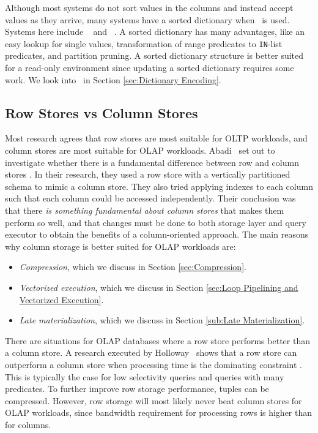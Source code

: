 Although most systems do not sort values in the columns and instead accept values as they arrive, many systems have a sorted dictionary when \de~is used. Systems here include \blink~\cite{Johnson2008-cp} and \saph~\cite{Farber2012-vh}. A sorted dictionary has many advantages, like an easy lookup for single values, transformation of range predicates to \texttt{IN}-list predicates, and partition pruning. A sorted dictionary structure is better suited for a read-only environment since updating a sorted dictionary requires some work. We look into \de~in Section \ref{sec:Dictionary Encoding}. 

\subsection{Row Stores vs Column Stores}
\label{sub:Row Stores vs Column Stores}
Most research agrees that row stores are most suitable for OLTP workloads, and column stores are most suitable for OLAP workloads. Abadi \ea~set out to investigate whether there is a fundamental difference between row and column stores \cite{Abadi2008-dd}. In their research, they used a row store with a vertically partitioned schema to mimic a column store. They also tried applying indexes to each column such that each column could be accessed independently. Their conclusion was that there \textit{is something fundamental about column stores} that makes them perform so well, and that changes must be done to both storage layer and query executor to obtain the benefits of a column-oriented approach. The main reasons why column storage is better suited for OLAP workloads are:
\begin{itemize}
  \item \textit{Compression}, which we discuss in Section \ref{sec:Compression}.
  \item \textit{Vectorized execution}, which we discuss in Section \ref{sec:Loop Pipelining and Vectorized Execution}. 
  \item \textit{Late materialization}, which we discuss in Section \ref{sub:Late Materialization}. 
\end{itemize}

There are situations for OLAP databases where a row store performs better than a column store. A research executed by Holloway \ea~shows that a row store can outperform a column store when processing time is the dominating constraint \cite{Holloway2008-rr}. This is typically the case for low selectivity queries and queries with many predicates. To further improve row storage performance, tuples can be compressed. However, row storage will most likely never beat column stores for OLAP workloads, since bandwidth requirement for processing rows is higher than for columns.

